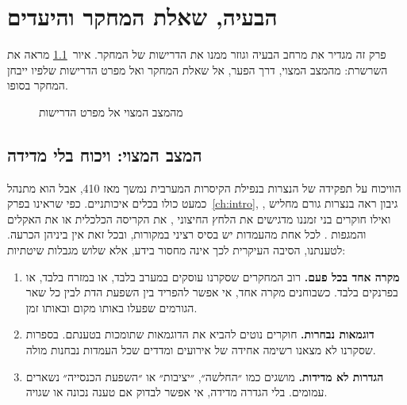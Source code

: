 
\chapter{הבעיה, שאלת המחקר והיעדים}
\label{ch:problem}

פרק זה מגדיר את מרחב הבעיה וגוזר ממנו את הדרישות של המחקר. איור~\ref{fig:problem-chain} מראה את השרשרת: מהמצב המצוי, דרך הפער, אל שאלת המחקר ואל מפרט הדרישות שלפיו ייבחן המחקר בסופו.

\begin{figure}[htbp]
  \centering
  
  \caption{מהמצב המצוי אל מפרט הדרישות}
  \label{fig:problem-chain}
\end{figure}

\section{המצב המצוי: ויכוח בלי מדידה}
\label{sec:problem-current}

הוויכוח על תפקידה של הנצרות בנפילת הקיסרות המערבית נמשך מאז 410, אבל הוא מתנהל כמעט כולו בכלים איכותניים. כפי שראינו בפרק~\ref{ch:intro}, גיבון ראה בנצרות גורם מחליש \cite{gibbon_decline}, ואילו חוקרים בני זמננו מדגישים את הלחץ החיצוני \cite{heather2005fall}, את הקריסה הכלכלית \cite{wardperkins2005fall} או את האקלים והמגפות \cite{harper2017fate}. לכל אחת מהעמדות יש בסיס רציני במקורות, ובכל זאת אין ביניהן הכרעה. לטענתנו, הסיבה העיקרית לכך אינה מחסור בידע, אלא שלוש מגבלות שיטתיות:

\begin{enumerate}
  \item \textbf{מקרה אחד בכל פעם.} רוב המחקרים שסקרנו עוסקים במערב בלבד, או במזרח בלבד, או בפרנקים בלבד. כשבוחנים מקרה אחד, אי אפשר להפריד בין השפעת הדת לבין כל שאר הגורמים שפעלו באותו מקום ובאותו זמן.
  \item \textbf{דוגמאות נבחרות.} חוקרים נוטים להביא את הדוגמאות שתומכות בטענתם. בספרות שסקרנו לא מצאנו רשימה אחידה של אירועים ומדדים שכל העמדות נבחנות מולה.
  \item \textbf{הגדרות לא מדידות.} מושגים כמו ״החלשה״, ״יציבות״ או ״השפעת הכנסייה״ נשארים עמומים. בלי הגדרה מדידה, אי אפשר לבדוק אם טענה נכונה או שגויה.
\end{enumerate}

